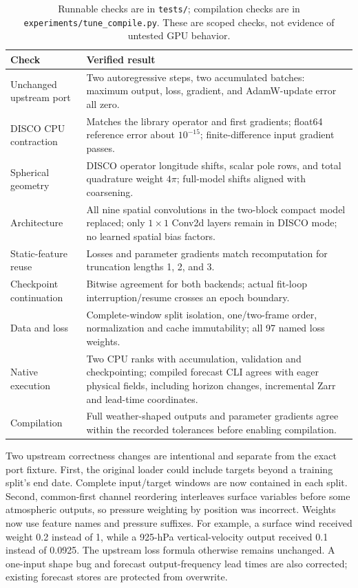 \documentclass[10pt]{article}
\begin{document}
\begin{table}[ht]
\centering\small
\begin{tabular}{lp{9.1cm}}
\toprule
Check & Verified result \\
\midrule
Unchanged upstream port & Two autoregressive steps, two accumulated batches: maximum output, loss, gradient, and AdamW-update error all zero. \\
DISCO CPU contraction & Matches the library operator and first gradients; float64 reference error about $10^{-15}$; finite-difference input gradient passes. \\
Spherical geometry & DISCO operator longitude shifts, scalar pole rows, and total quadrature weight $4\pi$; full-model shifts aligned with coarsening. \\
Architecture & All nine spatial convolutions in the two-block compact model replaced; only $1\times1$ Conv2d layers remain in DISCO mode; no learned spatial bias factors. \\
Static-feature reuse & Losses and parameter gradients match recomputation for truncation lengths 1, 2, and 3. \\
Checkpoint continuation & Bitwise agreement for both backends; actual fit-loop interruption/resume crosses an epoch boundary. \\
Data and loss & Complete-window split isolation, one/two-frame order, normalization and cache immutability; all 97 named loss weights. \\
Native execution & Two CPU ranks with accumulation, validation and checkpointing; compiled forecast CLI agrees with eager physical fields, including horizon changes, incremental Zarr and lead-time coordinates. \\
Compilation & Full weather-shaped outputs and parameter gradients agree within the recorded tolerances before enabling compilation. \\
\bottomrule
\end{tabular}
\caption{Runnable checks are in \texttt{tests/}; compilation checks are in \texttt{experiments/tune\_compile.py}. These are scoped checks, not evidence of untested GPU behavior.}
\end{table}

Two upstream correctness changes are intentional and separate from the exact port
fixture. First, the original loader could include targets beyond a training split's
end date. Complete input/target windows are now contained in each split. Second,
common-first channel reordering interleaves surface variables before some atmospheric
outputs, so pressure weighting by position was incorrect. Weights now use feature
names and pressure suffixes. For example, a surface wind received weight 0.2 instead
of 1, while a 925-hPa vertical-velocity output received 0.1 instead of 0.0925. The
upstream loss formula otherwise remains unchanged. A one-input shape bug and
forecast output-frequency lead times are also corrected; existing forecast stores
are protected from overwrite.
\end{document}
